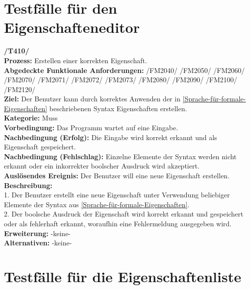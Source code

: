 \documentclass[a4paper]{scrreprt}
\begin{document}
\section{Testfälle für den Eigenschafteneditor}
\textbf{/T410/} \\
\textbf{Prozess:} Erstellen einer korrekten Eigenschaft. \\
\textbf{Abgedeckte Funktionale Anforderungen:} /FM2040/ /FM2050/ /FM2060/ /FM2070/ /FM2071/ /FM2072/ /FM2073/ /FM2080/ /FM2090/ /FM2100/ /FM2120/ \\
\textbf{Ziel:} Der Benutzer kann durch korrektes Anwenden der in \ref{Sprache-für-formale-Eigenschaften} beschriebenen Syntax Eigenschaften erstellen. \\
\textbf{Kategorie:} Muss\\
\textbf{Vorbedingung:} Das Programm wartet auf eine Eingabe.\\
\textbf{Nachbedingung (Erfolg):} Die Eingabe wird korrekt erkannt und als Eigenschaft gespeichert. \\
\textbf{Nachbedingung (Fehlschlag):} Einzelne Elemente der Syntax werden nicht erkannt oder ein inkorrekter boolscher Ausdruck wird akzeptiert. \\
\textbf{Auslösendes Ereignis:} Der Benutzer will eine neue Eigenschaft erstellen. \\
\textbf{Beschreibung:} \\
1. Der Benutzer erstellt eine neue Eigenschaft unter Verwendung beliebiger Elemente der Syntax aus \ref{Sprache-für-formale-Eigenschaften}. \\
2. Der boolsche Ausdruck der Eigenschaft wird korrekt erkannt und gespeichert oder als fehlerhaft erkannt, woraufhin eine Fehlermeldung ausgegeben wird. \\
\textbf {Erweiterung:} -keine- \\
\textbf {Alternativen:} -keine- \\

\section{Testfälle für die Eigenschaftenliste}
\end{document}
